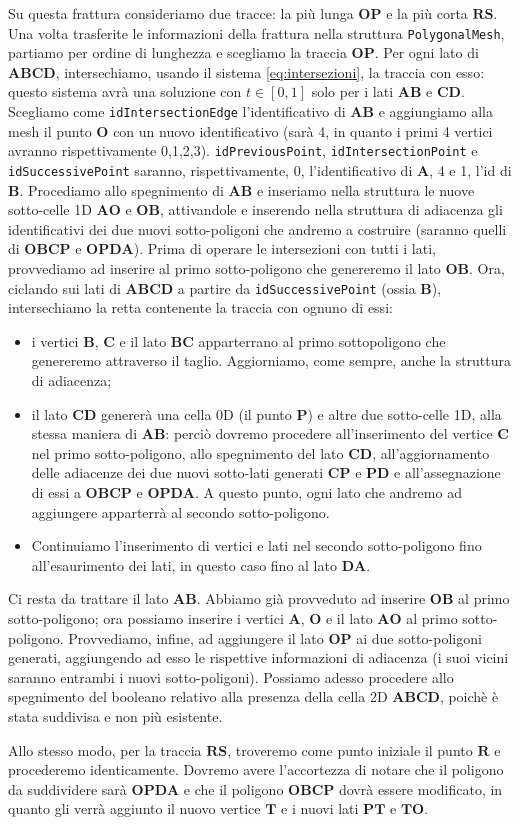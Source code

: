 \documentclass[a4paper]{article}
\newcommand{\B}{\mathbf}
\begin{document}
Su questa frattura consideriamo due tracce: la più lunga $\B{OP}$ e la più corta $\B{RS}$. Una volta trasferite le informazioni della frattura nella struttura \texttt{PolygonalMesh}, partiamo per ordine di lunghezza e scegliamo la traccia $\B{OP}$. Per ogni lato di $\B{ABCD}$, intersechiamo, usando il sistema \eqref{eq:intersezioni}, la traccia con esso: questo sistema avrà una soluzione con $t\in[0,1]$ solo per i lati $\B{AB}$ e $\B{CD}$. Scegliamo come \texttt{idIntersectionEdge} l'identificativo di $\B{AB}$ e aggiungiamo alla mesh il punto $\B O$ con un nuovo identificativo (sarà 4, in quanto i primi 4 vertici avranno rispettivamente 0,1,2,3).
 \texttt{idPreviousPoint}, \texttt{idIntersectionPoint} e \texttt{idSuccessivePoint} saranno, rispettivamente, 0, l'identificativo di $\B A$, 4 e 1, l'id di $\B B$. Procediamo allo spegnimento di $\B{AB}$ e inseriamo nella struttura le nuove sotto-celle 1D $\B{AO}$ e $\B{OB}$, attivandole e inserendo nella struttura di adiacenza gli identificativi dei due nuovi sotto-poligoni che andremo a costruire (saranno quelli di $\B{OBCP}$ e $\B{OPDA}$). Prima di operare le intersezioni con tutti i lati, provvediamo ad inserire al primo sotto-poligono che genereremo il lato $\B{OB}$. Ora, ciclando sui lati di $\B{ABCD}$ a partire da \texttt{idSuccessivePoint} (ossia $\B{B}$), intersechiamo la retta contenente la traccia con ognuno di essi: \begin{itemize} \item i vertici $\B{B}$, $\B C$ e il lato $\B{BC}$ apparterrano al primo sottopoligono che genereremo attraverso il taglio. Aggiorniamo, come sempre, anche la struttura di adiacenza; \item il lato $\B{CD}$ genererà una cella 0D (il punto $\B{P}$) e altre due sotto-celle 1D, alla stessa maniera di $\B{AB}$: perciò dovremo procedere all'inserimento del vertice $\B C$ nel primo sotto-poligono, allo spegnimento del lato $\B{CD}$, all'aggiornamento delle adiacenze dei due nuovi sotto-lati generati $\B{CP}$ e $\B{PD}$ e all'assegnazione di essi a $\B{OBCP}$ e $\B{OPDA}$. A questo punto, ogni lato che andremo ad aggiungere apparterrà al secondo sotto-poligono. \item Continuiamo l'inserimento di vertici e lati nel secondo sotto-poligono fino all'esaurimento dei lati, in questo caso fino al lato $\B{DA}$. \end{itemize} Ci resta da trattare il lato $\B{AB}$. Abbiamo già provveduto ad inserire $\B{OB}$ al primo sotto-poligono; ora possiamo inserire i vertici $\B A$, $\B O$ e il lato $\B{AO}$ al primo sotto-poligono. Provvediamo, infine, ad aggiungere il lato $\B{OP}$ ai due sotto-poligoni generati, aggiungendo ad esso le rispettive informazioni di adiacenza (i suoi vicini saranno entrambi i nuovi sotto-poligoni). Possiamo adesso procedere allo spegnimento del booleano relativo alla presenza della cella 2D $\B{ABCD}$, poichè è stata suddivisa e non più esistente.


Allo stesso modo, per la traccia $\B{RS}$, troveremo come punto iniziale il punto $\B{R}$ e procederemo identicamente. Dovremo avere l'accortezza di notare che il poligono da suddividere sarà $\B{OPDA}$ e che il poligono $\B{OBCP}$ dovrà essere modificato, in quanto gli verrà aggiunto il nuovo vertice $\B T$ e i nuovi lati $\B{PT}$ e $\B{TO}$.
\end{document}
